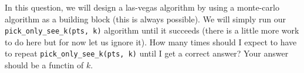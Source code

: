 \documentclass[11pt]{article}
\begin{document}
In this question, we will design a las-vegas algorithm by using a monte-carlo algorithm as a building block (this is always possible). We will simply run our \texttt{pick\_only\_see\_k(pts, k)} algorithm until it succeeds (there is a little more work to do here but for now let us ignore it). How many times should I expect to have to repeat \texttt{pick\_only\_see\_k(pts, k)} until I get a correct answer? Your answer should be a functin of $k$.
\end{document}
